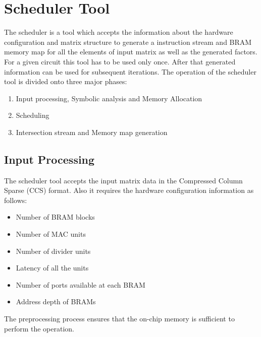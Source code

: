 \chapter{Scheduler Tool}
\label{chapter:scheduler}
The scheduler is a tool which accepts the information about the hardware configuration 
and matrix structure to generate a instruction stream and BRAM memory map
for all the elements of input matrix as well as the generated factors. For a 
given circuit this tool has to be used only once. After that generated information 
can be used for subsequent iterations. The operation of the scheduler tool is divided onto 
three major phases: 
\begin{enumerate}
    \item Input processing, Symbolic analysis and Memory Allocation
    \item Scheduling 
    \item Intersection stream and Memory map generation
\end{enumerate}

\section{Input Processing}
The scheduler tool accepts the input matrix data in the Compressed Column Sparse (CCS)
format. Also it requires the hardware configuration information as follows:
\begin{multicols}{2}
    \begin{itemize}
        \item Number of BRAM blocks
        \item Number of MAC units
        \item Number of divider units
        \item Latency of all the units
        \item Number of ports available at each BRAM
        \item Address depth of BRAMs
    \end{itemize}
\end{multicols}
The preprocessing process ensures that the  on-chip memory is sufficient to perform the 
operation.



